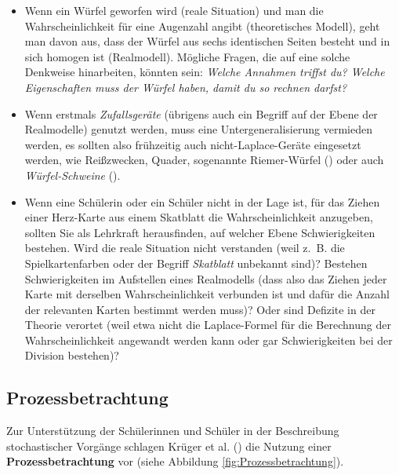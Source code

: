 \documentclass[
]{scrbook}
\theoremstyle{definition}
\theoremstyle{definition}
\theoremstyle{definition}
\theoremstyle{definition}
\theoremstyle{remark}
\begin{document}
\begin{itemize}
\item
  Wenn ein Würfel geworfen wird (reale Situation) und man die Wahrscheinlichkeit für eine Augenzahl angibt (theoretisches Modell), geht man davon aus, dass der Würfel aus sechs identischen Seiten besteht und in sich homogen ist (Realmodell). Mögliche Fragen, die auf eine solche Denkweise hinarbeiten, könnten sein: \emph{Welche Annahmen triffst du? Welche Eigenschaften muss der Würfel haben, damit du so rechnen darfst?}
\item
  Wenn erstmals \emph{Zufallsgeräte} (übrigens auch ein Begriff auf der Ebene der Realmodelle) genutzt werden, muss eine Untergeneralisierung vermieden werden, es sollten also frühzeitig auch nicht-Laplace-Geräte eingesetzt werden, wie Reißzwecken, Quader, sogenannte Riemer-Würfel () oder auch \emph{Würfel-Schweine} ().
\item
  Wenn eine Schülerin oder ein Schüler nicht in der Lage ist, für das Ziehen einer Herz-Karte aus einem Skatblatt die Wahrscheinlichkeit anzugeben, sollten Sie als Lehrkraft herausfinden, auf welcher Ebene Schwierigkeiten bestehen. Wird die reale Situation nicht verstanden (weil z.~B. die Spielkartenfarben oder der Begriff \emph{Skatblatt} unbekannt sind)? Bestehen Schwierigkeiten im Aufstellen eines Realmodells (dass also das Ziehen jeder Karte mit derselben Wahrscheinlichkeit verbunden ist und dafür die Anzahl der relevanten Karten bestimmt werden muss)? Oder sind Defizite in der Theorie verortet (weil etwa nicht die Laplace-Formel für die Berechnung der Wahrscheinlichkeit angewandt werden kann oder gar Schwierigkeiten bei der Division bestehen)?
\end{itemize}

\subsection{Prozessbetrachtung}\label{prozessbetrachtung}

Zur Unterstützung der Schülerinnen und Schüler in der Beschreibung stochastischer Vorgänge schlagen Krüger et al. () die Nutzung einer \textbf{Prozessbetrachtung} vor (siehe Abbildung \ref{fig:Prozessbetrachtung}).
\end{document}
